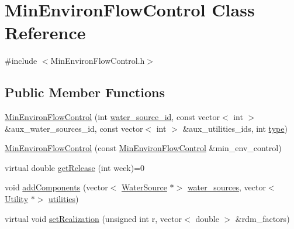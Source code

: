 \hypertarget{classMinEnvironFlowControl}{}\section{Min\+Environ\+Flow\+Control Class Reference}
\label{classMinEnvironFlowControl}


{\ttfamily \#include $<$Min\+Environ\+Flow\+Control.\+h$>$}

\subsection*{Public Member Functions}
\begin{DoxyCompactItemize}
\item 
\mbox{\hyperlink{classMinEnvironFlowControl_a5b40c3f8da8c63513edb30804bf2ca01_a5b40c3f8da8c63513edb30804bf2ca01}{Min\+Environ\+Flow\+Control}} (int \mbox{\hyperlink{classMinEnvironFlowControl_a571d4d56086eb752aebb20b2d85fa8e7_a571d4d56086eb752aebb20b2d85fa8e7}{water\+\_\+source\+\_\+id}}, const vector$<$ int $>$ \&aux\+\_\+water\+\_\+sources\+\_\+id, const vector$<$ int $>$ \&aux\+\_\+utilities\+\_\+ids, int \mbox{\hyperlink{classMinEnvironFlowControl_a1a10a6b5720c934eef698cd72c9d883c_a1a10a6b5720c934eef698cd72c9d883c}{type}})
\item 
\mbox{\hyperlink{classMinEnvironFlowControl_a274fc5217a2a79d9c488d903708f5e68_a274fc5217a2a79d9c488d903708f5e68}{Min\+Environ\+Flow\+Control}} (const \mbox{\hyperlink{classMinEnvironFlowControl}{Min\+Environ\+Flow\+Control}} \&min\+\_\+env\+\_\+control)
\item 
virtual double \mbox{\hyperlink{classMinEnvironFlowControl_ac7357455a533f7e6882cdb1ef303359b_ac7357455a533f7e6882cdb1ef303359b}{get\+Release}} (int week)=0
\item 
void \mbox{\hyperlink{classMinEnvironFlowControl_a9dd9d33661f121dda9704288658ecf7e_a9dd9d33661f121dda9704288658ecf7e}{add\+Components}} (vector$<$ \mbox{\hyperlink{classWaterSource}{Water\+Source}} $\ast$$>$ \mbox{\hyperlink{classMinEnvironFlowControl_ac5be281d802ad1de433bed588bb13cfe_ac5be281d802ad1de433bed588bb13cfe}{water\+\_\+sources}}, vector$<$ \mbox{\hyperlink{classUtility}{Utility}} $\ast$$>$ \mbox{\hyperlink{classMinEnvironFlowControl_a6c43408d05901838fa567c8e23a37009_a6c43408d05901838fa567c8e23a37009}{utilities}})
\item 
virtual void \mbox{\hyperlink{classMinEnvironFlowControl_a99dd7bb49edc3ae8f919e403ccc92bd9_a99dd7bb49edc3ae8f919e403ccc92bd9}{set\+Realization}} (unsigned int r, vector$<$ double $>$ \&rdm\+\_\+factors)
\end{DoxyCompactItemize}
